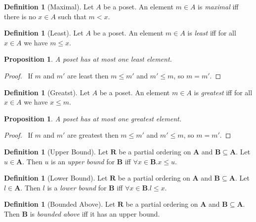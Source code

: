 \documentclass{book}
\let\qed\relax
\newtheorem{prop}[ax]{Proposition}
\theoremstyle{definition}
\newtheorem{df}[ax]{Definition}
\begin{document}
\begin{df}[Maximal]
Let $A$ be a poset. An element $m \in A$ is \emph{maximal} iff there is no $x \in A$ such that $m < x$.
\end{df}

\begin{df}[Least]
Let $A$ be a poset. An element $m \in A$ is \emph{least} iff for all $x \in A$ we have $m \leq x$.
\end{df}

\begin{prop}
A poset has at most one least element.
\end{prop}

\begin{proof}
\pf\ If $m$ and $m'$ are least then $m \leq m'$ and $m' \leq m$, so $m = m'$. \qed
\end{proof}

\begin{df}[Greatst]
Let $A$ be a poset. An element $m \in A$ is \emph{greatest} iff for all $x \in A$ we have $x \leq m$.
\end{df}

\begin{prop}
A poset has at most one greatest element.
\end{prop}

\begin{proof}
\pf\ If $m$ and $m'$ are greatest then $m \leq m'$ and $m' \leq m$, so $m = m'$. \qed
\end{proof}

\begin{df}[Upper Bound]
Let $\mathbf{R}$ be a partial ordering on $\mathbf{A}$ and $\mathbf{B} \subseteq \mathbf{A}$. Let $u \in \mathbf{A}$. Then $u$ is an \emph{upper bound} for $\mathbf{B}$ iff $\forall x \in \mathbf{B}. x \leq u$.
\end{df}

\begin{df}[Lower Bound]
Let $\mathbf{R}$ be a partial ordering on $\mathbf{A}$ and $\mathbf{B} \subseteq \mathbf{A}$. Let $l \in \mathbf{A}$. Then $l$ is a \emph{lower bound} for $\mathbf{B}$ iff $\forall x \in \mathbf{B}. l \leq x$.
\end{df}

\begin{df}[Bounded Above]
Let $\mathbf{R}$ be a partial ordering on $\mathbf{A}$ and $\mathbf{B} \subseteq \mathbf{A}$. Then $\mathbf{B}$ is \emph{bounded above} iff it has an upper bound.
\end{df}
\end{document}
